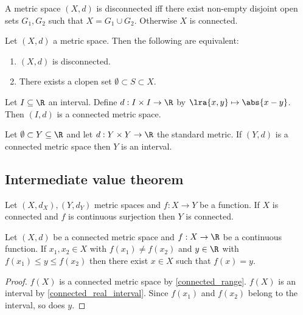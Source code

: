 \documentclass{article}
\begin{document}
\begin{definition}
	A metric space $(X,d)$ is disconnected iff there exist non-empty disjoint open sets
	$G_1,G_2$ such that $X=G_1\cup G_2$. Otherwise $X$ is connected.
\end{definition}

\begin{lemma}[10.2]
	Let $(X,d)$ a metric space. Then the following are equivalent:
	\begin{enumerate}
		\item $(X,d)$ is disconnected.
		\item There exists a clopen set $\emptyset\subset S\subset X$.
	\end{enumerate}
\end{lemma}

\begin{proposition}[10.4]
	Let $I\subseteq\R$ an interval. Define $d:I\times I\to\R$ by $\lra{x,y}\mapsto\abs{x-y}$.
	Then $(I,d)$ is a connected metric space.
\end{proposition}

\begin{proposition}[10.5]
	\label{connected_real_interval}
	Let $\emptyset\subset Y\subseteq\R$ and let $d:Y\times Y\to\R$ the standard metric.
	If $(Y,d)$ is a connected metric space then $Y$ is an interval.
\end{proposition}

\subsection{Intermediate value theorem}

\begin{proposition}[10.6]
	\label{connected_range}
	Let $(X,d_X),(Y,d_Y)$ metric spaces and $f:X\to Y$ be a function. If $X$ is connected
	and $f$ is continuous surjection then $Y$ is connected.
\end{proposition}

\begin{theorem}
	Let $(X,d)$ be a connected metric space and $f:X\to\R$ be a continuous function. If
	$x_1,x_2\in X$ with $f(x_1)\neq f(x_2)$ and $y\in\R$ with $f(x_1)\leq y\leq f(x_2)$ then there exist
	$x\in X$ such that $f(x)=y$.
	\begin{proof}
		$f(X)$ is a connected metric space by \ref{connected_range}.
		$f(X)$ is an interval by \ref{connected_real_interval}.
		Since $f(x_1)$ and $f(x_2)$ belong to the interval, so does $y$.
	\end{proof}
\end{theorem}
\end{document}
